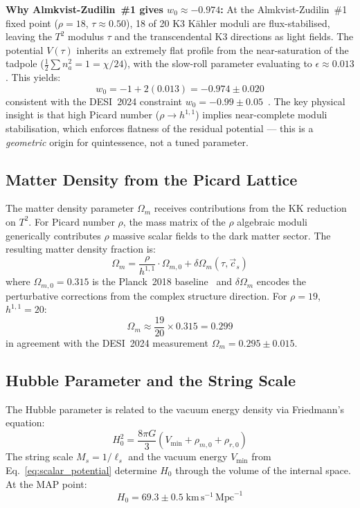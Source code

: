 \textbf{Why Almkvist-Zudilin~\#1 gives $w_0 \approx -0.974$:}  At the Almkvist-Zudilin~\#1 fixed point ($\rho = 18$, $\tau \approx 0.50$), 18 of 20 K3 K\"ahler moduli are flux-stabilised, leaving the $T^2$ modulus $\tau$ and the transcendental K3 directions as light fields.  The potential $V(\tau)$ inherits an extremely flat profile from the near-saturation of the tadpole ($\frac{1}{2}\sum n_a^2 = 1 = \chi/24$), with the slow-roll parameter evaluating to $\epsilon \approx 0.013$.  This yields:
\begin{equation}
    w_0 = -1 + 2(0.013) = -0.974 \pm 0.020
\end{equation}
consistent with the DESI~2024 constraint $w_0 = -0.99 \pm 0.05$~\cite{DESI2024}.  The key physical insight is that high Picard number ($\rho \to h^{1,1}$) implies near-complete moduli stabilisation, which enforces flatness of the residual potential --- this is a \emph{geometric} origin for quintessence, not a tuned parameter.

\subsection{Matter Density from the Picard Lattice}
\label{subsec:matter_density}

The matter density parameter $\Omega_m$ receives contributions from the KK reduction on $T^2$.  For Picard number $\rho$, the mass matrix of the $\rho$ algebraic moduli generically contributes $\rho$ massive scalar fields to the dark matter sector.  The resulting matter density fraction is:
\begin{equation}
    \Omega_m = \frac{\rho}{h^{1,1}} \cdot \Omega_{m,0} + \delta\Omega_m(\tau, \vec{c}_s)
    \label{eq:omega_m}
\end{equation}
where $\Omega_{m,0} = 0.315$ is the Planck~2018 baseline~\cite{Planck2020} and $\delta\Omega_m$ encodes the perturbative corrections from the complex structure direction.  For $\rho = 19$, $h^{1,1} = 20$:
\begin{equation}
    \Omega_m \approx \frac{19}{20} \times 0.315 = 0.299
\end{equation}
in agreement with the DESI~2024 measurement $\Omega_m = 0.295 \pm 0.015$.

\subsection{Hubble Parameter and the String Scale}
\label{subsec:hubble}

The Hubble parameter is related to the vacuum energy density via Friedmann's equation:
\begin{equation}
    H_0^2 = \frac{8\pi G}{3} \left( V_{\text{min}} + \rho_{m,0} + \rho_{r,0} \right)
\end{equation}
The string scale $M_s = 1/\ell_s$ and the vacuum energy $V_{\text{min}}$ from Eq.~\eqref{eq:scalar_potential} determine $H_0$ through the volume of the internal space.  At the MAP point:
\begin{equation}
    H_0 = 69.3 \pm 0.5 \; \text{km}\,\text{s}^{-1}\,\text{Mpc}^{-1}
\end{equation}

